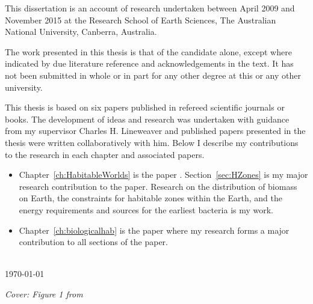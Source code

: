 \begin{declaration}
\begingroup
\large
\noindent This dissertation is an account of research undertaken between April 2009 and November 2015 at the Research School of Earth Sciences, The Australian National University, Canberra, Australia. 


The work presented in this thesis is that of the candidate alone, except where indicated by due literature reference and acknowledgements in the text. It has not been submitted in whole or in part for any other degree at this or any other university.

This thesis is based on six papers published in refereed scientific journals or books. The development of ideas and research was undertaken with guidance from my supervisor Charles H. Lineweaver and published papers presented in the thesis were written collaboratively with him. Below I describe my contributions to the research in each chapter and associated papers.

\begin{itemize}
\item Chapter~\ref{ch:HabitableWorlds} is the paper \citet{Lineweaver2012AnnRev}. Section~\ref{sec:HZones} is my major research contribution to the paper. Research on the distribution of biomass on Earth, the constraints for habitable zones within the Earth, and the energy requirements and sources for the earliest bacteria is my work.
\item Chapter~\ref{ch:biologicalhab} is the paper \citet{Chopra2016} where my research forms a major contribution to all sections of the paper.
\end{itemize}


\bigskip
\vspace{1cm}
\begin{flushright}
\authorname\\
\today
\end{flushright}
\endgroup
\end{declaration}
\vspace{3cm}
\begingroup
\footnotesize\emph{{Cover: Figure 1 from }}
\endgroup
\cleardoublepage


